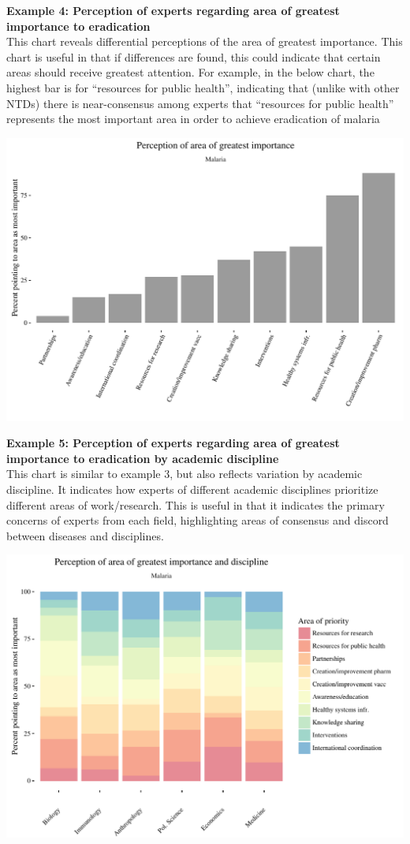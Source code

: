 \documentclass{article}
\begin{document}
\newpage
\noindent \textbf{Example 4: Perception of experts regarding area of greatest importance to eradication} \\
\noindent This chart reveals differential perceptions of the area of greatest importance. This chart is useful in that if differences are found, this could indicate that certain areas should receive greatest attention. For example, in the below chart, the highest bar is for “resources for public health”, indicating that (unlike with other NTDs) there is near-consensus among experts that “resources for public health” represents the most important area in order to achieve eradication of malaria

\begin{center}
\includegraphics{chart4.pdf}
\end{center}

\newpage
\noindent \textbf{Example 5: Perception of experts regarding area of greatest importance to eradication by academic discipline} \\
\noindent This chart is similar to example 3, but also reflects variation by academic discipline. It indicates how experts of different academic disciplines prioritize different areas of work/research. This is useful in that it indicates the primary concerns of experts from each field, highlighting areas of consensus and discord between diseases and disciplines.

\begin{center}
\includegraphics{chart5.pdf}
\end{center}

\newpage

{}
  
\end{document}
